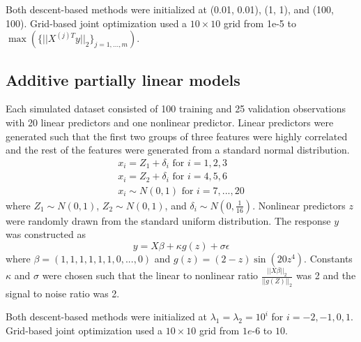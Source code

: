 \documentclass[10pt,letterpaper]{article}
\begin{document}
Both descent-based methods were initialized at (0.01, 0.01), (1, 1), and (100, 100). Grid-based joint optimization used a $10 \times 10$ grid from 1e-5 to $\max(\{||X^{(j)T}y ||_2\}_{j=1,..., m})$.

\subsection{Additive partially linear models}\label{sec:simulationAPLM}

Each simulated dataset consisted of 100 training and 25 validation observations with 20 linear predictors and one nonlinear predictor. Linear predictors were generated such that the first two groups of three features were highly correlated and the rest of the features were generated from a standard normal distribution.
\begin{equation}
\begin{array}{c}
x_i = Z_1 + \delta_i \text{ for } i=1, 2, 3 \\
x_i = Z_2 + \delta_i \text{ for } i= 4, 5, 6 \\
x_i \sim N(0,1) \text{ for } i = 7, ..., 20
\end{array}
\end{equation}
where $Z_1 \sim N(0,1)$, $Z_2 \sim N(0,1)$, and $\delta_i \sim N(0, \frac{1}{16})$. Nonlinear predictors $z$ were randomly drawn from the standard uniform distribution. The response $y$ was constructed as
\begin{equation}
y = X\beta + \kappa g(z) + \sigma \epsilon
\end{equation}
where $\beta = (1, 1, 1, 1, 1, 1, 0, ..., 0)$ and $g(z) =(2-z)\sin(20z^4)$. Constants $\kappa$ and $\sigma$ were chosen such that the linear to nonlinear ratio $\frac{||X\beta||_2}{||g(Z)||_2}$ was 2 and the signal to noise ratio was 2. 

Both descent-based methods were initialized at $\lambda_1 = \lambda_2 = 10^i$ for $i=-2, -1, 0, 1$. Grid-based joint optimization used a $10 \times 10$ grid from $1e\text{-}6$ to $10$.
\end{document}
